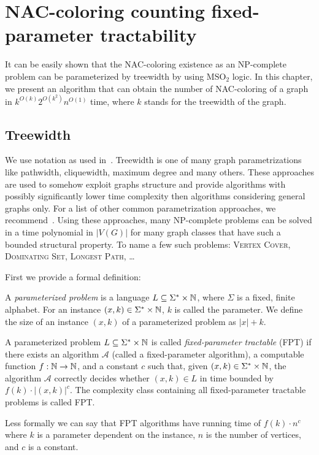 
\chapter{NAC-coloring counting fixed-parameter tractability}%
\label{chapter:fpt}

\begin{chapterabstract}

	It can be easily shown that the NAC-coloring existence as an NP-complete
	problem can be parameterized by treewidth by using \( \text{MSO}_2 \) logic.
	In this chapter, we present an algorithm that can obtain
	the number of NAC-coloring of a graph in \({k}^{O(k)} 2^{O(k^2)} n^{O(1)}\) time,
	where \(k\) stands for the treewidth of the graph.

\end{chapterabstract}

\section{Treewidth}

We use notation as used in~\cite{book_parametrized_algorithms}.
Treewidth is one of many graph parametrizations like
pathwidth, cliquewidth, maximum degree and many others.
These approaches are used to somehow exploit graphs structure
and provide algorithms with possibly significantly lower time complexity
then algorithms considering general graphs only.
For a list of other common parametrization approaches,
we recommend~\cite{tree_width_comparision_other_classes}.
Using these approaches, many NP-complete problems can be solved
in a time polynomial in \( |V(G)| \)
for many graph classes that have such a bounded structural property.
To name a few such problems:
\textsc{Vertex Cover}, \textsc{Dominating Set}, \textsc{Longest Path}, \dots

First we provide a formal definition:
%
\begin{definition}
	A \emph{parameterized problem} is a language \( L \subseteq \Sigma^* \times \mathbb{N} \), where
	\( \Sigma \) is a fixed, finite alphabet. For an instance \( (x, k) \in \Sigma^* \times \mathbb{N} \), \( k \) is called the
	parameter.
	We define the size of an instance \( (x, k) \) of a parameterized problem as \( |x| + k \).
\end{definition}
%
\begin{definition}
	A parameterized problem \( L \subseteq \Sigma^* \times \mathbb{N} \) is called \emph{fixed-parameter tractable} (FPT)
	if there exists an algorithm \( \mathcal{A} \) (called a fixed-parameter
	algorithm), a computable function \( f: \mathbb{N} \to \mathbb{N} \), and a constant
	\( c \) such that, given \( (x, k) \in \Sigma^* \times \mathbb{N} \), the algorithm \( \mathcal{A} \)
	correctly decides
	whether \( (x, k) \in L \) in time bounded by \( f(k) \cdot |(x, k)|^c \). The complexity
	class containing all fixed-parameter tractable problems is called FPT\@.
\end{definition}
%
Less formally we can say that FPT algorithms
have running time of \( f(k)\cdot n^c \)
where \( k \) is a parameter dependent on the instance,
\( n \) is the number of vertices,
and \( c \) is a constant.

